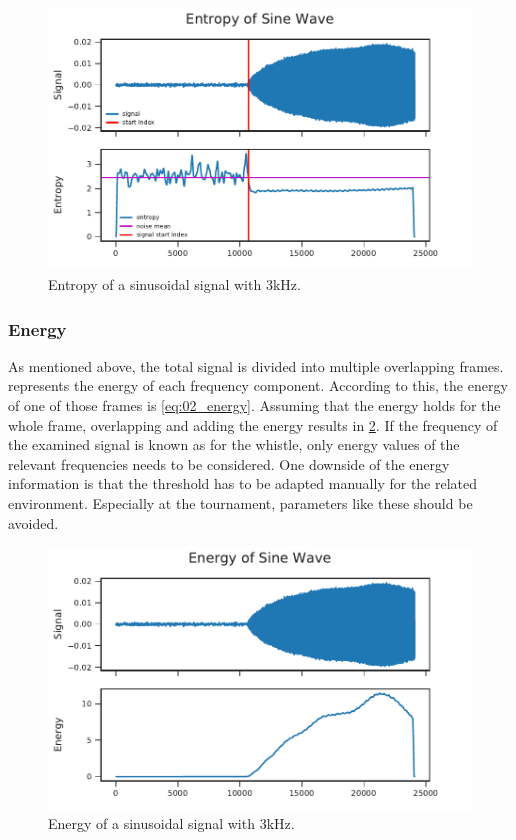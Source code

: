 \begin{figure}[ht]
	\centering
		\includegraphics[]{figures/sine_entropy}
	\caption{Entropy of a sinusoidal signal with 3\si{\kilo\hertz}.}
	\label{fig:03_entropy}
\end{figure}

\subsubsection*{Energy}

As mentioned above, the total signal is divided into multiple overlapping frames.
 represents the energy of each frequency
component.
According to this, the energy of one of those frames is \cref{eq:02_energy}.
Assuming that the energy holds for the whole frame, overlapping and adding the energy
results in \cref{fig:03_energy}.
If the frequency of the examined signal is known as for the whistle, only energy values
of the relevant frequencies needs to be considered.
One downside of the energy information is that the threshold has to be adapted
manually for the related environment.
Especially at the tournament, parameters like these should be avoided.

\begin{figure}[ht]
	\centering
		\includegraphics[]{figures/sine_energy}
	\caption{Energy of a sinusoidal signal with 3\si{\kilo\hertz}.}
	\label{fig:03_energy}
\end{figure}


